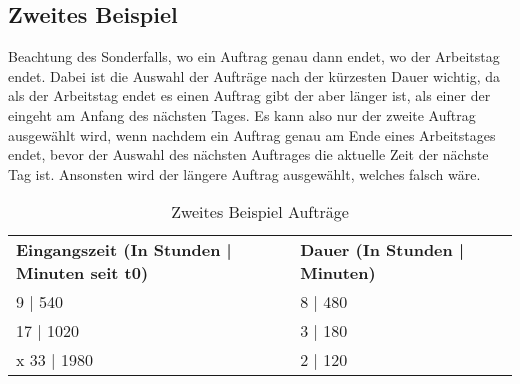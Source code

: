 \documentclass[a4paper,10pt,ngerman]{scrartcl}
\begin{document}
\subsection{Zweites Beispiel}\label{sec:beispiel2}
Beachtung des Sonderfalls, wo ein Auftrag genau dann endet, wo der Arbeitstag endet.
Dabei ist die Auswahl der Aufträge nach der kürzesten Dauer wichtig,
da als der Arbeitstag endet es einen Auftrag gibt der aber länger ist,
als einer der eingeht am Anfang des nächsten Tages.
Es kann also nur der zweite Auftrag ausgewählt wird,
wenn nachdem ein Auftrag genau am Ende eines Arbeitstages endet,
bevor der Auswahl des nächsten Auftrages die aktuelle Zeit der nächste Tag ist.
Ansonsten wird der längere Auftrag ausgewählt, welches falsch wäre.

 \begin{table}[htb]
    \centering
    \begin{tabular}{lll}
    \textbf{Eingangszeit (In Stunden | Minuten seit t0)} & \textbf{Dauer (In Stunden | Minuten)} \\
    9 | 540 & 8 | 480 \\
    17 | 1020 & 3 | 180 \\
x    33 | 1980 & 2 | 120 \\
    \end{tabular}
    \caption{Zweites Beispiel Aufträge}
    \label{tab:Table1}
 \end{table}
\end{document}
